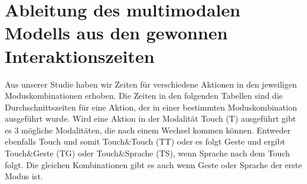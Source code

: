 \section[Herleitung des Modells]{Ableitung des multimodalen Modells aus den gewonnen Interaktionszeiten}\label{sec:Herleitung}
Aus unserer Studie haben wir Zeiten für verschiedene Aktionen in den jeweiligen Moduskombinationen erhoben. 
Die Zeiten in den folgenden Tabellen sind die Durchschnittszeiten für eine Aktion, der in einer bestimmten Moduskombination ausgeführt wurde. 
Wird eine Aktion in der Modalität Touch (T) ausgeführt gibt es 3 mögliche Modalitäten, die nach einem Wechsel kommen können. 
Entweder ebenfalls Touch und somit Touch\&Touch (TT) oder es folgt Geste und ergibt Touch\&Geste (TG) oder Touch\&Sprache (TS), wenn Sprache nach dem Touch folgt. 
Die gleichen Kombinationen gibt es auch wenn Geste oder Sprache der erste Modus ist. 

